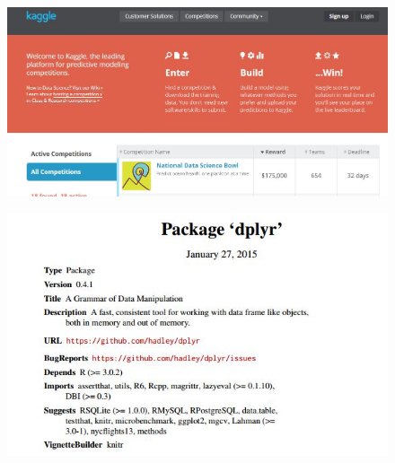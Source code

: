 \documentclass{beamer}
\begin{document}
\begin{frame}
	\begin{figure}
		\centering
		\includegraphics[width=1.05\linewidth]{tenpackintro05}
		
	\end{figure}
	
\end{frame}
\begin{frame}
	\begin{figure}
		\centering
		\includegraphics[width=1.05\linewidth]{tenpack00}
		
	\end{figure}
	
\end{frame}
\end{document}
